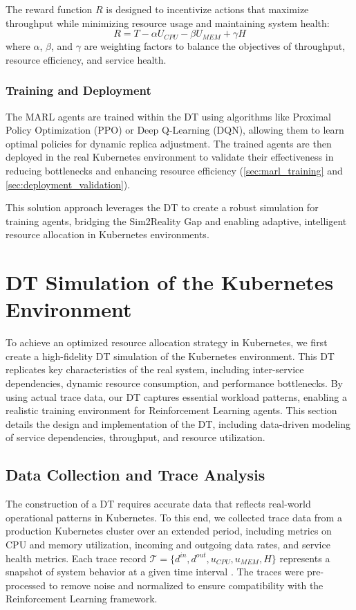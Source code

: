\documentclass[conference]{IEEEtran}
\begin{document}
The reward function $R$ is designed to incentivize actions that maximize throughput while minimizing resource usage and maintaining system health:
\begin{equation}
    R = T - \alpha U_{CPU} - \beta U_{MEM} + \gamma H
\end{equation}
where $\alpha$, $\beta$, and $\gamma$ are weighting factors to balance the objectives of throughput, resource efficiency, and service health.

\subsubsection{Training and Deployment}

The MARL agents are trained within the DT using algorithms like Proximal Policy Optimization (PPO) or Deep Q-Learning (DQN), allowing them to learn optimal policies for dynamic replica adjustment. The trained agents are then deployed in the real Kubernetes environment to validate their effectiveness in reducing bottlenecks and enhancing resource efficiency (\autoref{sec:marl_training} and \autoref{sec:deployment_validation}).

This solution approach leverages the DT to create a robust simulation for training agents, bridging the Sim2Reality Gap and enabling adaptive, intelligent resource allocation in Kubernetes environments.


\section{DT Simulation of the Kubernetes Environment}
\label{sec:digital_twin_design}
To achieve an optimized resource allocation strategy in Kubernetes, we first create a high-fidelity DT simulation of the Kubernetes environment. This DT replicates key characteristics of the real system, including inter-service dependencies, dynamic resource consumption, and performance bottlenecks. By using actual trace data, our DT captures essential workload patterns, enabling a realistic training environment for Reinforcement Learning agents. This section details the design and implementation of the DT, including data-driven modeling of service dependencies, throughput, and resource utilization.

\subsection{Data Collection and Trace Analysis}

The construction of a DT requires accurate data that reflects real-world operational patterns in Kubernetes. To this end, we collected trace data from a production Kubernetes cluster over an extended period, including metrics on CPU and memory utilization, incoming and outgoing data rates, and service health metrics. Each trace record $\mathcal{T} = \{\mathit{d^{in}}, \mathit{d^{out}}, \mathit{u_{CPU}}, \mathit{u_{MEM}}, \mathit{H}\}$ represents a snapshot of system behavior at a given time interval \cite{park_predictive_scaling}. The traces were pre-processed to remove noise and normalized to ensure compatibility with the Reinforcement Learning framework.
\end{document}
